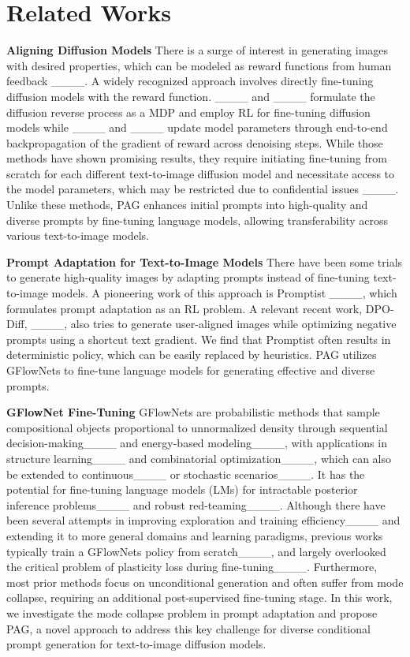 \section{Related Works}
\noindent\textbf{Aligning Diffusion Models}
There is a surge of interest in generating images with desired properties, which can be modeled as reward functions from human feedback ____. 
A widely recognized approach involves directly fine-tuning diffusion models with the reward function. ____ and ____ formulate the diffusion reverse process as a MDP and employ RL for fine-tuning diffusion models while ____ and ____ update model parameters through end-to-end backpropagation of the gradient of reward across denoising steps. 
While those methods have shown promising results, 
they require initiating fine-tuning from scratch for each different text-to-image diffusion model and necessitate access to the model parameters, which may be restricted due to confidential issues ____. Unlike these methods, PAG enhances initial prompts into high-quality and diverse prompts by fine-tuning language models, allowing transferability across various text-to-image models. 

\vspace{5pt}
\noindent\textbf{Prompt Adaptation for Text-to-Image Models}
There have been some trials to generate high-quality images by adapting prompts instead of fine-tuning text-to-image models. A pioneering work of this approach is Promptist ____, which formulates prompt adaptation as an RL problem.
A relevant recent work, DPO-Diff, ____, also tries to generate user-aligned images while optimizing negative prompts using a shortcut text gradient. We find that Promptist often results in deterministic policy, which can be easily replaced by heuristics. PAG utilizes GFlowNets to fine-tune language models for generating effective and diverse prompts. 

\vspace{5pt}
\noindent\textbf{GFlowNet Fine-Tuning}
GFlowNets are probabilistic methods that sample compositional objects proportional to unnormalized density through sequential decision-making____ and energy-based modeling____, with applications in structure learning____ and combinatorial optimization____, which can also be extended to continuous____ or stochastic scenarios____.
It has the potential for fine-tuning language models (LMs) for intractable posterior inference problems____ and robust red-teaming____.
Although there have been several attempts in improving exploration and training efficiency____ and extending it to more general domains and learning paradigms, previous works typically train a GFlowNets policy from scratch____, and largely overlooked the critical problem of plasticity loss during fine-tuning____.
Furthermore, most prior methods focus on unconditional generation and often suffer from mode collapse, requiring an additional post-supervised fine-tuning stage. 
In this work, we investigate the mode collapse problem in prompt adaptation and propose PAG, a novel approach to address this key challenge for diverse conditional prompt generation for text-to-image diffusion models.